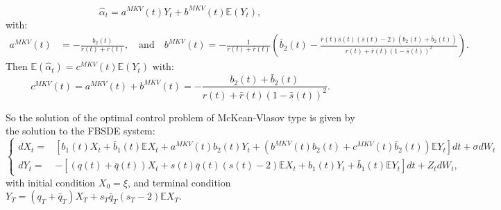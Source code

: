 \documentclass[11pt]{article}
\begin{document}
\begin{equation}
    \hat{\alpha}_t=a^{MKV}(t)Y_t+b^{MKV}(t)\mathbb{E}(Y_t),
    \label{eq:alpha_hat_MKV}
\end{equation}
with:
\begin{equation*}
\begin{split}
    a^{MKV}(t)&=-\frac{b_2(t)}{r(t)+\bar{r}(t)}, \quad \text{and} \quad b^{MKV}(t)=-\frac{1}{r(t)+\bar{r}(t)}\left(\bar{b}_2(t)-\frac{\bar{r}(t)\bar{s}(t)(\bar{s}(t)-2)(b_2(t)+\bar{b}_2(t))}{r(t)+\bar{r}(t)(1-\bar{s}(t))^2} \right).
\end{split}
\end{equation*}
Then $\mathbb{E}(\hat{\alpha}_t)=c^{MKV}(t)\mathbb{E}(Y_t)$ with:
   $$ c^{MKV}(t)=a^{MKV}(t)+b^{MKV}(t)=-\frac{b_2(t)+\bar{b}_2(t)}{r(t)+\bar{r}(t)(1-\bar{s}(t))^2}.$$

So the solution of the optimal control problem of McKean-Vlasov type is given by the solution to the FBSDE system:
\begin{equation}
\left\{
\begin{split}
        dX_t=&\left[b_1(t)X_t+\bar{b}_1(t) \mathbb{E}X_t+a^{MKV}(t)b_2(t)Y_t+(b^{MKV}(t)b_2(t)+c^{MKV}(t)\bar{b}_2(t))\mathbb{E}Y_t\right]dt+\sigma dW_t \\
        dY_t=&-\left[(q(t)+\bar{q}(t))X_t+s(t)\bar{q}(t)(s(t)-2)\mathbb{E}X_t+b_1(t)Y_t+\bar{b}_1(t)\mathbb{E}Y_t\right]dt +Z_t dW_t,
\end{split}
\right.
\label{eq:FBSDE_EMKV}
\end{equation}
with initial condition $X_0=\xi$, and terminal condition $Y_T=(q_T+\bar{q}_T)X_T+s_T\bar{q}_T(s_T-2)\mathbb{E}X_T$.
\end{document}
